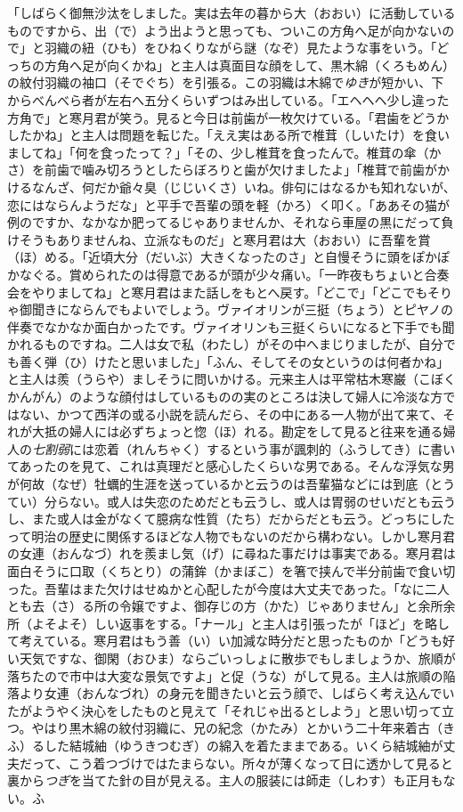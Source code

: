 「しばらく御無沙汰をしました。実は去年の暮から大（おおい）に活動しているものですから、出（で）よう出ようと思っても、ついこの方角へ足が向かないので」と羽織の紐（ひも）をひねくりながら謎（なぞ）見たような事をいう。「どっちの方角へ足が向くかね」と主人は真面目な顔をして、黒木綿（くろもめん）の紋付羽織の袖口（そでぐち）を引張る。この羽織は木綿で\emph{ゆき}が短かい、下からべんべら者が左右へ五分くらいずつはみ出している。「エヘヘヘ少し違った方角で」と寒月君が笑う。見ると今日は前歯が一枚欠けている。「君歯をどうかしたかね」と主人は問題を転じた。「ええ実はある所で椎茸（しいたけ）を食いましてね」「何を食ったって？」「その、少し椎茸を食ったんで。椎茸の傘（かさ）を前歯で噛み切ろうとしたらぼろりと歯が欠けましたよ」「椎茸で前歯がかけるなんざ、何だか爺々臭（じじいくさ）いね。俳句にはなるかも知れないが、恋にはならんようだな」と平手で吾輩の頭を軽（かろ）く叩く。「ああその猫が例のですか、なかなか肥ってるじゃありませんか、それなら車屋の黒にだって負けそうもありませんね、立派なものだ」と寒月君は大（おおい）に吾輩を賞（ほ）める。「近頃大分（だいぶ）大きくなったのさ」と自慢そうに頭をぽかぽかなぐる。賞められたのは得意であるが頭が少々痛い。「一昨夜もちょいと合奏会をやりましてね」と寒月君はまた話しをもとへ戻す。「どこで」「どこでもそりゃ御聞きにならんでもよいでしょう。ヴァイオリンが三挺（ちょう）とピヤノの伴奏でなかなか面白かったです。ヴァイオリンも三挺くらいになると下手でも聞かれるものですね。二人は女で私（わたし）がその中へまじりましたが、自分でも善く弾（ひ）けたと思いました」「ふん、そしてその女というのは何者かね」と主人は羨（うらや）ましそうに問いかける。元来主人は平常枯木寒巌（こぼくかんがん）のような顔付はしているものの実のところは決して婦人に冷淡な方ではない、かつて西洋の或る小説を読んだら、その中にある一人物が出て来て、それが大抵の婦人には必ずちょっと惚（ほ）れる。勘定をして見ると往来を通る婦人の\emph{七割弱}には恋着（れんちゃく）するという事が諷刺的（ふうしてき）に書いてあったのを見て、これは真理だと感心したくらいな男である。そんな浮気な男が何故（なぜ）牡蠣的生涯を送っているかと云うのは吾輩猫などには到底（とうてい）分らない。或人は失恋のためだとも云うし、或人は胃弱のせいだとも云うし、また或人は金がなくて臆病な性質（たち）だからだとも云う。どっちにしたって明治の歴史に関係するほどな人物でもないのだから構わない。しかし寒月君の女連（おんなづ）れを羨まし気（げ）に尋ねた事だけは事実である。寒月君は面白そうに口取（くちとり）の蒲鉾（かまぼこ）を箸で挟んで半分前歯で食い切った。吾輩はまた欠けはせぬかと心配したが今度は大丈夫であった。「なに二人とも去（さ）る所の令嬢ですよ、御存じの方（かた）じゃありません」と余所余所（よそよそ）しい返事をする。「ナール」と主人は引張ったが「ほど」を略して考えている。寒月君はもう善（い）い加減な時分だと思ったものか「どうも好い天気ですな、御閑（おひま）ならごいっしょに散歩でもしましょうか、旅順が落ちたので市中は大変な景気ですよ」と促（うな）がして見る。主人は旅順の陥落より女連（おんなづれ）の身元を聞きたいと云う顔で、しばらく考え込んでいたがようやく決心をしたものと見えて「それじゃ出るとしよう」と思い切って立つ。やはり黒木綿の紋付羽織に、兄の紀念（かたみ）とかいう二十年来着古（きふ）るした結城紬（ゆうきつむぎ）の綿入を着たままである。いくら結城紬が丈夫だって、こう着つづけではたまらない。所々が薄くなって日に透かして見ると裏から\emph{つぎ}を当てた針の目が見える。主人の服装には師走（しわす）も正月もない。ふ